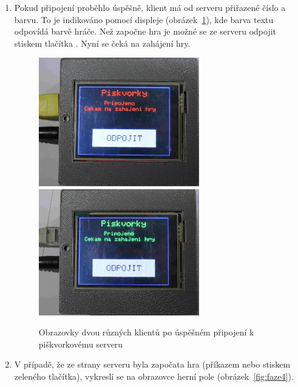 \begin{enumerate}
\item Pokud připojení proběhlo úspěšně, klient má od serveru přiřazené číslo a barvu. To je indikováno pomocí displeje (obrázek~\ref{fig:faze3}), kde barva textu odpovídá barvě hráče. Než započne hra je možné se ze serveru odpojit stiskem tlačítka . Nyní se čeká na zahájení hry.
\begin{figure}[H]
\centering
\includegraphics[width=7cm, angle=0]{img/gameFlow/phase03a.jpg}
\includegraphics[width=7cm, angle=0]{img/gameFlow/phase03b.jpg}
\caption{\label{fig:faze3} Obrazovky dvou různých klientů  po úspěšném připojení k piškvorkovému serveru}
\end{figure}
\label{item:faze3}

\item V případě, že ze strany serveru byla započata hra (příkazem nebo stiskem zeleného tlačítka), vykreslí se na obrazovce herní pole (obrázek~\ref{fig:faze4}).


\end{enumerate}
